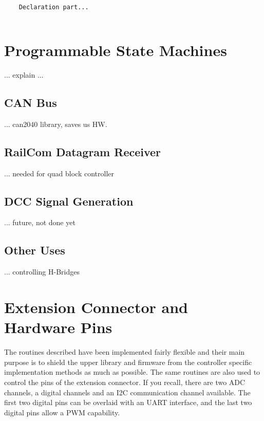 \lstset{language=c++, style=codesnippetstyle}
\begin{lstlisting}
   
    Declaration part...
    
\end{lstlisting}
\FloatBarrier

\section{Programmable State Machines}

... explain ...

\subsection{CAN Bus}

... can2040 library, saves us HW.

\subsection{RailCom Datagram Receiver}

... needed for quad block controller

\subsection{DCC Signal Generation}

... future, not done yet 

\subsection{Other Uses} 

... controlling H-Bridges

\section{Extension Connector and Hardware Pins}

The routines described have been implemented fairly flexible and their main purpose is to shield the upper library and firmware from the controller specific implementation methods as much as possible. The same routines are also used to control the pins of the extension connector. If you recall, there are two ADC channels, a digital channels and an I2C communication channel available. The first two digital pins can be overlaid with an UART interface, and the last two digital pins allow a PWM capability.

